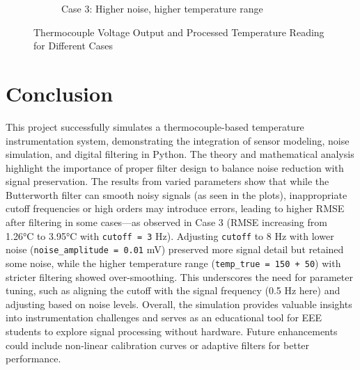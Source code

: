 \documentclass[12pt]{article}
\begin{document}
\begin{figure}[h]
\begin{subfigure}[b]{0.8\textwidth}
        \caption{Case 3: Higher noise, higher temperature range}
        \label{fig:case3}
    \end{subfigure}
    \caption{Thermocouple Voltage Output and Processed Temperature Reading for Different Cases}
\end{figure}

\section*{Conclusion}
This project successfully simulates a thermocouple-based temperature instrumentation system, demonstrating the integration of sensor modeling, noise simulation, and digital filtering in Python. The theory and mathematical analysis highlight the importance of proper filter design to balance noise reduction with signal preservation. The results from varied parameters show that while the Butterworth filter can smooth noisy signals (as seen in the plots), inappropriate cutoff frequencies or high orders may introduce errors, leading to higher RMSE after filtering in some cases—as observed in Case 3 (RMSE increasing from 1.26°C to 3.95°C with \texttt{cutoff = 3} Hz). Adjusting \texttt{cutoff} to 8 Hz with lower noise (\texttt{noise\_amplitude = 0.01} mV) preserved more signal detail but retained some noise, while the higher temperature range (\texttt{temp\_true = 150 + 50}) with stricter filtering showed over-smoothing. This underscores the need for parameter tuning, such as aligning the cutoff with the signal frequency (0.5 Hz here) and adjusting based on noise levels. Overall, the simulation provides valuable insights into instrumentation challenges and serves as an educational tool for EEE students to explore signal processing without hardware. Future enhancements could include non-linear calibration curves or adaptive filters for better performance.
\end{document}

